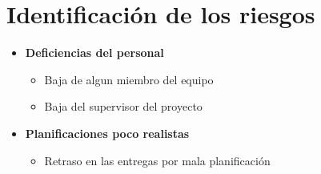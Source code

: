 \documentclass[spanish,a4paper,12pt]{report}	%
\begin{document}
\part{Identificación de los riesgos}
\begin{itemize}
\item \textbf {Deficiencias del personal}
	\begin{itemize}
		\item {Baja de algun miembro del equipo}
		\item {Baja del supervisor del proyecto}
	\end{itemize}
\item \textbf {Planificaciones poco realistas}
	\begin{itemize}
		\item {Retraso en las entregas por mala planificación}


\end{itemize}
\end{itemize}
\end{document}

